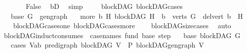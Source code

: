 \begin{isabellebody}
\ \ \ \ \isamarkupfalse%
\ \isamarkupfalse%
\ {\isachardoublequoteopen}False{\isachardoublequoteclose}\ \isamarkupfalse%
\ bD\ \isamarkupfalse%
\ simp\isanewline
\ \ \isamarkupfalse%
\isanewline
{}\isamarkupfalse%
%
\endisatagproof
{\isafoldproof}%
%
\isadelimproof
\isanewline
%
\endisadelimproof
\isanewline
{}\isamarkupfalse%
\ {\isacharparenleft}{\kern0pt}\ blockDAG{\isacharparenright}{\kern0pt}\ blockDAG{\isacharunderscore}{\kern0pt}cases{\isacharcolon}{\kern0pt}\isanewline
\ \ \ {\isacharparenleft}{\kern0pt}base{\isacharparenright}{\kern0pt}\ {\isachardoublequoteopen}{\isacharparenleft}{\kern0pt}G\ {\isacharequal}{\kern0pt}\ gen{\isacharunderscore}{\kern0pt}graph{\isacharparenright}{\kern0pt}{\isachardoublequoteclose}\isanewline
\ \ {\isacharbar}{\kern0pt}\ {\isacharparenleft}{\kern0pt}more{\isacharparenright}{\kern0pt}\ {\isachardoublequoteopen}{\isacharparenleft}{\kern0pt}{\isasymexists}b\ H{\isachardot}{\kern0pt}\ {\isacharparenleft}{\kern0pt}blockDAG\ H\ {\isasymand}\ b\ {\isasymin}\ verts\ G\ {\isasymand}\ del{\isacharunderscore}{\kern0pt}vert\ b\ {\isacharequal}{\kern0pt}\ H{\isacharparenright}{\kern0pt}{\isacharparenright}{\kern0pt}{\isachardoublequoteclose}\isanewline
%
\isadelimproof
\ \ %
\endisadelimproof
%
\isatagproof
{}\isamarkupfalse%
\ blockDAG{\isacharunderscore}{\kern0pt}cases{\isacharunderscore}{\kern0pt}one\ blockDAG{\isacharunderscore}{\kern0pt}cases{\isacharunderscore}{\kern0pt}more\isanewline
\ \ \ \ blockDAG{\isacharunderscore}{\kern0pt}size{\isacharunderscore}{\kern0pt}cases\ \isamarkupfalse%
\ auto%
\endisatagproof
{\isafoldproof}%
%
\isadelimproof
\isanewline
%
\endisadelimproof
\isanewline
{}\isamarkupfalse%
\ blockDAG{\isacharunderscore}{\kern0pt}induct{\isacharbrackleft}{\kern0pt}consumes\ {}{\isacharcomma}{\kern0pt}\ case{\isacharunderscore}{\kern0pt}names\ fund\ base\ step{\isacharbrackright}{\kern0pt}{\isacharcolon}{\kern0pt}\isanewline
\ \ \ base{\isacharcolon}{\kern0pt}\ {\isachardoublequoteopen}blockDAG\ G{\isachardoublequoteclose}\isanewline
\ \ \ cases{\isacharcolon}{\kern0pt}\ {\isachardoublequoteopen}{\isasymAnd}V{\isacharcolon}{\kern0pt}{\isacharcolon}{\kern0pt}{\isacharparenleft}{\kern0pt}{\isacharprime}{\kern0pt}a{\isacharcomma}{\kern0pt}{\isacharprime}{\kern0pt}b{\isacharparenright}{\kern0pt}\ pre{\isacharunderscore}{\kern0pt}digraph{\isachardot}{\kern0pt}\ blockDAG\ V\ {\isasymLongrightarrow}\ P\ {\isacharparenleft}{\kern0pt}blockDAG{\isachardot}{\kern0pt}gen{\isacharunderscore}{\kern0pt}graph\ V{\isacharparenright}{\kern0pt}{\isachardoublequoteclose}\isanewline

\end{isabellebody}

